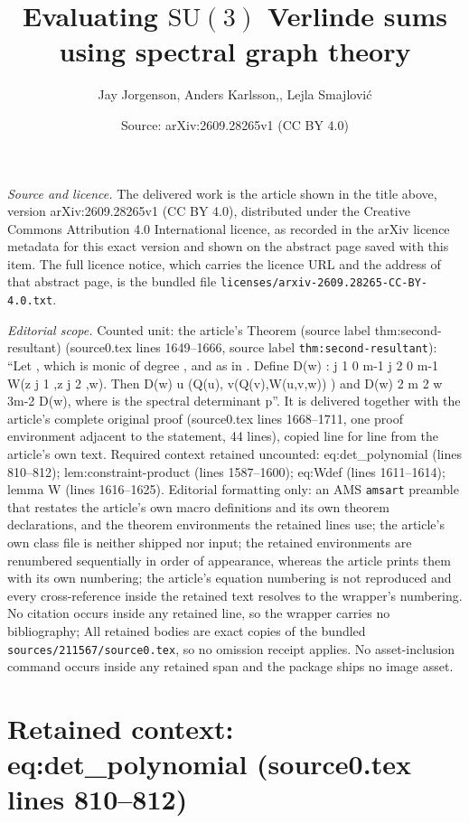 \documentclass[10pt,a4paper]{amsart}
\title[Evaluating $\mathrm {SU}(3)$ Verlinde sums using spectral graph theory]{Evaluating $\mathrm {SU}(3)$ Verlinde sums using spectral graph theory}
\author{Jay Jorgenson, Anders Karlsson,, Lejla Smajlovi\'c}
\date{Source: arXiv:2609.28265v1 (CC BY 4.0)}
\theoremstyle{plain}
\theoremstyle{remark}
\begin{document}
\maketitle

\noindent\emph{Source and licence.} The delivered work is the article shown in the title above, version arXiv:2609.28265v1 (CC BY 4.0), distributed under the Creative Commons Attribution 4.0 International licence, as recorded in the arXiv licence metadata for this exact version and shown on the abstract page saved with this item. The full licence notice, which carries the licence URL and the address of that abstract page, is the bundled file \texttt{licenses/arxiv-2609.28265-CC-BY-4.0.txt}.
\par\smallskip

\noindent\textit{Editorial scope.} Counted unit: the article's Theorem (source label thm:second-resultant) (source0.tex lines 1649--1666, source label \texttt{thm:second-resultant}): ``Let , which is monic of degree , and as in . Define D(w) : j 1 0 m-1 j 2 0 m-1 W(z j 1 ,z j 2 ,w). Then D(w) u (Q(u), v(Q(v),W(u,v,w)) ) and D(w) 2 m 2 w 3m-2 D(w), where is the spectral determinant p''. It is delivered together with the article's complete original proof (source0.tex lines 1668--1711, one proof environment adjacent to the statement, 44 lines), copied line for line from the article's own text. Required context retained uncounted: eq:det\_polynomial (lines 810--812); lem:constraint-product (lines 1587--1600); eq:Wdef (lines 1611--1614); lemma W (lines 1616--1625). Editorial formatting only: an AMS \texttt{amsart} preamble that restates the article's own macro definitions and its own theorem declarations, and the theorem environments the retained lines use; the article's own class file is neither shipped nor input; the retained environments are renumbered sequentially in order of appearance, whereas the article prints them with its own numbering; the article's equation numbering is not reproduced and every cross-reference inside the retained text resolves to the wrapper's numbering. No citation occurs inside any retained line, so the wrapper carries no bibliography; All retained bodies are exact copies of the bundled \texttt{sources/211567/source0.tex}, so no omission receipt applies. No asset-inclusion command occurs inside any retained span and the package ships no image asset.


\section*{Retained context: eq:det\_polynomial (source0.tex lines 810--812)}
\end{document}
